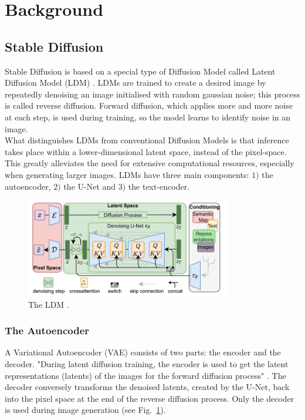 \section{Background} \label{backgorund}



\subsection{Stable Diffusion}
Stable Diffusion is based on a special type of Diffusion Model called Latent Diffusion Model (LDM) \cite{Rombach_2022_CVPR}. LDMs are trained to create a desired image by repeatedly denoising an image initialised with random gaussian noise; this process is called reverse diffusion. Forward diffusion, which applies more and more noise at each step, is used during training, so the model learns to identify noise in an image.\\
What distinguishes LDMs from conventional Diffusion Models is that inference takes place within a lower-dimensional latent space, instead of the pixel-space. This greatly alleviates the need for extensive computational resources, especially when generating larger images. LDMs have three main components: \(1)\) the autoencoder, \(2)\) the U-Net and \(3)\) the text-encoder.
\begin{figure}[!htb]
\centering
\includegraphics[width=0.8\textwidth]
{static/LDM.png}
\caption{The LDM \cite[Fig.~3]{Rombach_2022_CVPR}.}
\label{fig:ldm}
\end{figure}



\subsubsection{The Autoencoder}
A Variational Autoencoder (VAE) consists of two parts: the encoder and the decoder. "During latent diffusion training, the encoder is used to get the latent representations (latents) of the images for the forward diffusion process" \cite{patil2022stable}. The decoder conversely transforms the denoised latents, created by the U-Net, back into the pixel space at the end of the reverse diffusion process. Only the decoder is used during image generation (see Fig.~\ref{fig:ldm}).




